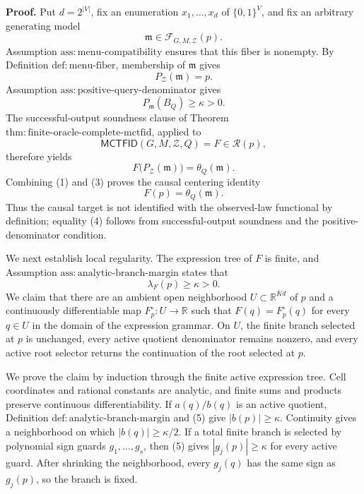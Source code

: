 \textbf{Proof.}
Put \(d=2^{|V|}\), fix an enumeration \(x_1,\ldots,x_d\) of \(\{0,1\}^{V}\), and fix an arbitrary generating model
\[
 \mathfrak m\in\mathcal F_{G,M,\mathcal Z}(p).
\]
Assumption \(\mathrm{ass:menu\text{-}compatibility}\) ensures that this fiber is nonempty.  By Definition \(\mathrm{def:menu\text{-}fiber}\), membership of \(\mathfrak m\) gives
\[
 P_{\mathcal Z}(\mathfrak m)=p. \tag{1}
\]
Assumption \(\mathrm{ass:positive\text{-}query\text{-}denominator}\) gives
\[
 P_{\mathfrak m}(B_Q)\geq\kappa>0. \tag{2}
\]
The successful-output soundness clause of Theorem \(\mathrm{thm:finite\text{-}oracle\text{-}complete\text{-}mctfid}\), applied to
\[
 \mathsf{MCTFID}(G,M,\mathcal Z,Q)=F\in\mathcal R(p),
\]
therefore yields
\[
 F\bigl(P_{\mathcal Z}(\mathfrak m)\bigr)=\theta_Q(\mathfrak m). \tag{3}
\]
Combining (1) and (3) proves the causal centering identity
\[
 F(p)=\theta_Q(\mathfrak m). \tag{4}
\]
Thus the causal target is not identified with the observed-law functional by definition; equality (4) follows from successful-output soundness and the positive-denominator condition.

We next establish local regularity.  The expression tree of \(F\) is finite, and Assumption \(\mathrm{ass:analytic\text{-}branch\text{-}margin}\) states that
\[
 \lambda_F(p)\geq\kappa>0. \tag{5}
\]
We claim that there are an ambient open neighborhood \(U\subset\mathbb R^{Kd}\) of \(p\) and a continuously differentiable map \(F_p^{\circ}:U\to\mathbb R\) such that \(F(q)=F_p^{\circ}(q)\) for every \(q\in U\) in the domain of the expression grammar.  On \(U\), the finite branch selected at \(p\) is unchanged, every active quotient denominator remains nonzero, and every active root selector returns the continuation of the root selected at \(p\).

We prove the claim by induction through the finite active expression tree.  Cell coordinates and rational constants are analytic, and finite sums and products preserve continuous differentiability.  If \(a(q)/b(q)\) is an active quotient, Definition \(\mathrm{def:analytic\text{-}branch\text{-}margin}\) and (5) give \(|b(p)|\geq\kappa\).  Continuity gives a neighborhood on which \(|b(q)|\geq\kappa/2\).  If a total finite branch is selected by polynomial sign guards \(g_1,\ldots,g_s\), then (5) gives \(|g_j(p)|\geq\kappa\) for every active guard.  After shrinking the neighborhood, every \(g_j(q)\) has the same sign as \(g_j(p)\), so the branch is fixed.

